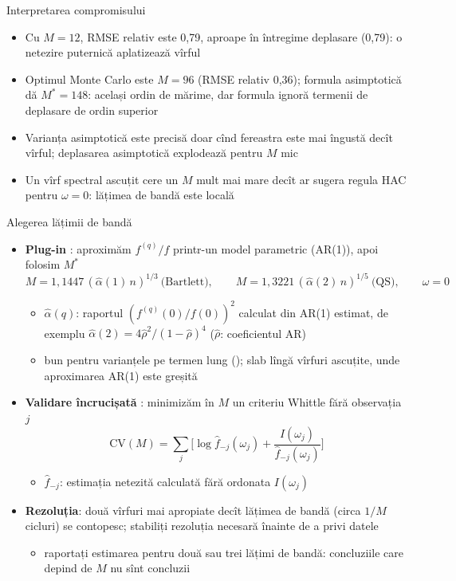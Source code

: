 \begin{frame}{Interpretarea compromisului}
\itemsize{\small}
\begin{itemize}
    \item Cu $M = 12$, RMSE relativ este 0{,}79, aproape în întregime deplasare (0{,}79): o netezire puternică aplatizează vîrful
    \item Optimul Monte Carlo este $M = 96$ (RMSE relativ 0{,}36); formula asimptotică dă $M^* = 148$: același ordin de mărime, dar formula ignoră termenii de deplasare de ordin superior
    \item Varianța asimptotică este precisă doar cînd fereastra este mai îngustă decît vîrful; deplasarea asimptotică explodează pentru $M$ mic
    \item Un vîrf spectral ascuțit cere un $M$ mult mai mare decît ar sugera regula HAC pentru $\omega = 0$: lățimea de bandă este locală
\end{itemize}
\end{frame}

\begin{frame}{Alegerea lățimii de bandă}
\itemsize{\small}
\begin{itemize}
    \item \textbf{Plug-in} : aproximăm $f^{(q)}/f$ printr-un model parametric (AR(1)), apoi folosim $M^*$
    \[ M = 1{,}1447\,(\hat\alpha(1)\,n)^{1/3} \ \text{(Bartlett)}, \qquad M = 1{,}3221\,(\hat\alpha(2)\,n)^{1/5} \ \text{(QS)}, \qquad \omega = 0 \]
    \begin{itemize}
        \item $\hat\alpha(q)$: raportul $(f^{(q)}(0)/f(0))^2$ calculat din AR(1) estimat, de exemplu $\hat\alpha(2) = 4\hat\rho^2/(1 - \hat\rho)^4$ ($\hat\rho$: coeficientul AR)
        \item bun pentru varianțele pe termen lung (); slab lîngă vîrfuri ascuțite, unde aproximarea AR(1) este greșită
    \end{itemize}
    \item \textbf{Validare încrucișată} : minimizăm în $M$ un criteriu Whittle fără observația $j$
    \[ \mathrm{CV}(M) = \sum_j\Big[\log\hat f_{-j}(\omega_j) + \frac{I(\omega_j)}{\hat f_{-j}(\omega_j)}\Big] \]
    \begin{itemize}
        \item $\hat f_{-j}$: estimația netezită calculată fără ordonata $I(\omega_j)$
    \end{itemize}
    \item \textbf{Rezoluția}: două vîrfuri mai apropiate decît lățimea de bandă (circa $1/M$ cicluri) se contopesc; stabiliți rezoluția necesară înainte de a privi datele
    \begin{itemize}
        \item raportați estimarea pentru două sau trei lățimi de bandă: concluziile care depind de $M$ nu sînt concluzii
    \end{itemize}
\end{itemize}
\end{frame}

